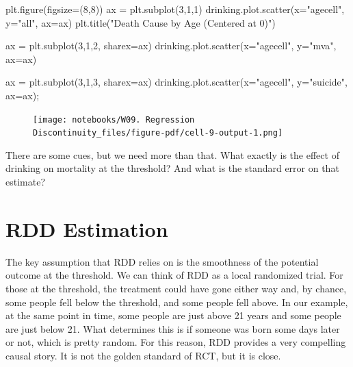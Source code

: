 \documentclass[
  letterpaper,
  DIV=11,
  numbers=noendperiod]{scrreprt}
\newenvironment{Shaded}{\begin{snugshade}}{\end{snugshade}}
\newcommand{\DecValTok}[1]{\textcolor[rgb]{0.68,0.00,0.00}{#1}}
\newcommand{\NormalTok}[1]{\textcolor[rgb]{0.00,0.23,0.31}{#1}}
\newcommand{\OperatorTok}[1]{\textcolor[rgb]{0.37,0.37,0.37}{#1}}
\newcommand{\StringTok}[1]{\textcolor[rgb]{0.13,0.47,0.30}{#1}}
\begin{document}
\begin{Shaded}
\begin{Highlighting}[]
\NormalTok{plt.figure(figsize}\OperatorTok{=}\NormalTok{(}\DecValTok{8}\NormalTok{,}\DecValTok{8}\NormalTok{))}
\NormalTok{ax }\OperatorTok{=}\NormalTok{ plt.subplot(}\DecValTok{3}\NormalTok{,}\DecValTok{1}\NormalTok{,}\DecValTok{1}\NormalTok{)}
\NormalTok{drinking.plot.scatter(x}\OperatorTok{=}\StringTok{"agecell"}\NormalTok{, y}\OperatorTok{=}\StringTok{"all"}\NormalTok{, ax}\OperatorTok{=}\NormalTok{ax)}
\NormalTok{plt.title(}\StringTok{"Death Cause by Age (Centered at 0)"}\NormalTok{)}

\NormalTok{ax }\OperatorTok{=}\NormalTok{ plt.subplot(}\DecValTok{3}\NormalTok{,}\DecValTok{1}\NormalTok{,}\DecValTok{2}\NormalTok{, sharex}\OperatorTok{=}\NormalTok{ax)}
\NormalTok{drinking.plot.scatter(x}\OperatorTok{=}\StringTok{"agecell"}\NormalTok{, y}\OperatorTok{=}\StringTok{"mva"}\NormalTok{, ax}\OperatorTok{=}\NormalTok{ax)}

\NormalTok{ax }\OperatorTok{=}\NormalTok{ plt.subplot(}\DecValTok{3}\NormalTok{,}\DecValTok{1}\NormalTok{,}\DecValTok{3}\NormalTok{, sharex}\OperatorTok{=}\NormalTok{ax)}
\NormalTok{drinking.plot.scatter(x}\OperatorTok{=}\StringTok{"agecell"}\NormalTok{, y}\OperatorTok{=}\StringTok{"suicide"}\NormalTok{, ax}\OperatorTok{=}\NormalTok{ax)}\OperatorTok{;}
\end{Highlighting}
\end{Shaded}

\begin{figure}[H]

{\centering \texttt{[image: notebooks/W09. Regression Discontinuity\_files/figure-pdf/cell-9-output-1.png]}

}

\end{figure}

There are some cues, but we need more than that. What exactly is the
effect of drinking on mortality at the threshold? And what is the
standard error on that estimate?

\hypertarget{rdd-estimation}{%
\section{RDD Estimation}\label{rdd-estimation}}

The key assumption that RDD relies on is the smoothness of the potential
outcome at the threshold. We can think of RDD as a local randomized
trial. For those at the threshold, the treatment could have gone either
way and, by chance, some people fell below the threshold, and some
people fell above. In our example, at the same point in time, some
people are just above 21 years and some people are just below 21. What
determines this is if someone was born some days later or not, which is
pretty random. For this reason, RDD provides a very compelling causal
story. It is not the golden standard of RCT, but it is close.
\end{document}
